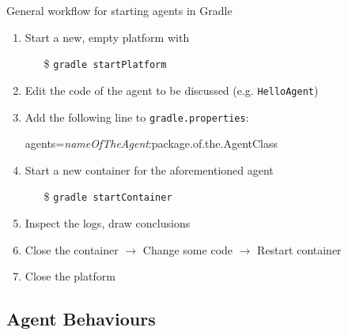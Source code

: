 \documentclass{beamer}\mode<presentation>{\usetheme{AMSCesenaPurpleAndGold}}
\begin{document}
\begin{frame}{General workflow for starting agents in Gradle}

    \begin{enumerate}
        \item Start a new, empty platform with
        \begin{itemize}
            \item[\$] \texttt{gradle startPlatform}
        \end{itemize}

        \vfill

        \item Edit the code of the agent to be discussed (e.g. \texttt{HelloAgent})

        \vfill

        \item Add the following line to \texttt{gradle.properties}:
        \begin{center}\ttfamily
            \alert{agents}=\textit{nameOfTheAgent}:package.of.the.AgentClass
        \end{center}

        \vfill

        \item Start a new container for the aforementioned agent
        \begin{itemize}
            \item[\$] \texttt{gradle startContainer}
        \end{itemize}

        \vfill

        \item Inspect the logs, draw conclusions

        \vfill

        \item Close the container $\rightarrow$ Change some code $\rightarrow$ Restart container

        \vfill

        \item Close the platform

    \end{enumerate}

\end{frame}

\subsection{Agent Behaviours}
\end{document}

